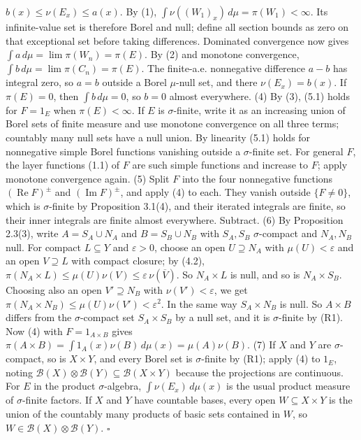 \documentclass[
  english,
  11pt,
  a4paper,
]{article}
\begin{document}
\(b(x)\leq\nu(E_x)\leq a(x)\). By (1),
\(\int\nu((W_1)_x)\,d\mu=\pi(W_1)<\infty\). Its infinite-value set is
therefore Borel and null; define all section bounds as zero on that
exceptional set before taking differences. Dominated convergence now
gives \(\int a\,d\mu=\lim\pi(W_n)=\pi(E)\). By (2) and monotone
convergence, \(\int b\,d\mu=\lim\pi(C_n)=\pi(E)\). The finite-a.e.
nonnegative difference \(a-b\) has integral zero, so \(a=b\) outside a
Borel \(\mu\)-null set, and there \(\nu(E_x)=b(x)\). If \(\pi(E)=0\),
then \(\int b\,d\mu=0\), so \(b=0\) almost everywhere. (4) By (3), (5.1)
holds for \(F=1_E\) when \(\pi(E)<\infty\). If \(E\) is
\(\sigma\)-finite, write it as an increasing union of Borel sets of
finite measure and use monotone convergence on all three terms;
countably many null sets have a null union. By linearity (5.1) holds for
nonnegative simple Borel functions vanishing outside a \(\sigma\)-finite
set. For general \(F\), the layer functions (1.1) of \(F\) are such
simple functions and increase to \(F\); apply monotone convergence
again. (5) Split \(F\) into the four nonnegative functions
\((\operatorname{Re}F)^\pm\) and \((\operatorname{Im}F)^\pm\), and apply
(4) to each. They vanish outside \(\{F\neq0\}\), which is
\(\sigma\)-finite by Proposition 3.1(4), and their iterated integrals
are finite, so their inner integrals are finite almost everywhere.
Subtract. (6) By Proposition 2.3(3), write \(A=S_A\cup N_A\) and
\(B=S_B\cup N_B\) with \(S_A,S_B\) \(\sigma\)-compact and \(N_A,N_B\)
null. For compact \(L\subseteq Y\) and \(\varepsilon>0\), choose an open
\(U\supseteq N_A\) with \(\mu(U)<\varepsilon\) and an open
\(V\supseteq L\) with compact closure; by (4.2),
\(\pi(N_A\times L)\leq\mu(U)\nu(V)\leq\varepsilon\,\nu(\overline V)\).
So \(N_A\times L\) is null, and so is \(N_A\times S_B\). Choosing also
an open \(V'\supseteq N_B\) with \(\nu(V')<\varepsilon\), we get
\(\pi(N_A\times N_B)\leq\mu(U)\nu(V')<\varepsilon^2\). In the same way
\(S_A\times N_B\) is null. So \(A\times B\) differs from the
\(\sigma\)-compact set \(S_A\times S_B\) by a null set, and it is
\(\sigma\)-finite by (R1). Now (4) with \(F=1_{A\times B}\) gives
\(\pi(A\times B)=\int1_A(x)\nu(B)\,d\mu(x)=\mu(A)\nu(B)\). (7) If \(X\)
and \(Y\) are \(\sigma\)-compact, so is \(X\times Y\), and every Borel
set is \(\sigma\)-finite by (R1); apply (4) to \(1_E\), noting
\(\mathcal B(X)\otimes\mathcal B(Y)\subseteq\mathcal B(X\times Y)\)
because the projections are continuous. For \(E\) in the product
\(\sigma\)-algebra, \(\int\nu(E_x)\,d\mu(x)\) is the usual product
measure of \(\sigma\)-finite factors. If \(X\) and \(Y\) have countable
bases, every open \(W\subseteq X\times Y\) is the union of the countably
many products of basic sets contained in \(W\), so
\(W\in\mathcal B(X)\otimes\mathcal B(Y)\). \(\square\)
\end{document}
